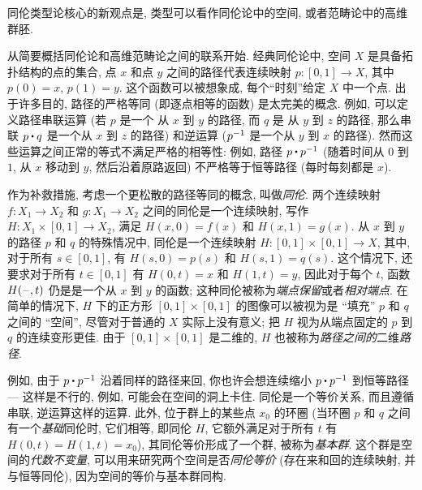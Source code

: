 同伦类型论核心的新观点是, 类型可以看作同伦论中的空间, 或者范畴论中的高维群胚.

从简要概括同伦论和高维范畴论之间的联系开始.
经典同伦论中, 空间 $X$ 是具备拓扑结构的点的集合,
%
%
点 $x$ 和点 $y$ 之间的路径代表连续映射 $p : [0,1] \to X$, 其中 $p(0) = x$, $p(1) = y$.
%
%
这个函数可以被想象成, 每个``时刻''给定 $X$ 中一个点.
出于许多目的, 路径的严格等同 (即逐点相等的函数) 是太完美的概念.
例如, 可以定义路径串联运算 (若 $p$ 是一个 从 $x$ 到 $y$ 的路径, 而 $q$ 是 从 $y$ 到 $z$ 的路径, 那么串联 $p \ct q$ 是一个从 $x$ 到 $z$ 的路径) 和逆运算 ($\mathord{{p}^{-1}}$ 是一个从 $y$ 到 $x$ 的路径).
然而这些运算之间正常的等式不满足严格的相等性: 例如, 路径 $p \ct \opp p$ (随着时间从 $0$ 到 $1$, 从 $x$ 移动到 $y$, 然后沿着原路返回) 不严格等于恒等路径 (每时每刻都是 $x$).

作为补救措施, 考虑一个更松散的路径等同的概念, 叫做\emph{同伦}.
两个连续映射 $f : X_1 \to X_2$ 和 $g : X_1\to X_2$ 之间的同伦是一个连续映射, 写作 $H : X_1 \times [0, 1] \to X_2$, 满足 $H(x, 0) = f (x)$ 和 $H(x, 1) = g(x)$.
从 $x$ 到 $y$ 的路径 $p$ 和 $q$ 的特殊情况中, 同伦是一个连续映射 $H : [0,1] \times [0,1] \rightarrow X$, 其中, 对于所有 $s\in [0,1]$, 有 $H(s,0) = p(s)$ 和 $H(s,1) = q(s)$.
这个情况下, 还要求对于所有 $t\in [0,1]$ 有 $H(0,t) = x$ 和 $H(1,t)=y$, 因此对于每个 $t$, 函数 $H(\mathord{\hspace{1pt}\text{--}\hspace{1pt}},t)$ 仍是是一个从 $x$ 到 $y$ 的函数;
这种同伦被称为\emph{端点保留}或者\emph{相对端点}.
在简单的情况下, $H$ 下的正方形 $[0,1]\times [0,1]$ 的图像可以被视为是 ``填充''  $p$ 和 $q$ 之间的 ``空间'', 尽管对于普通的 $X$ 实际上没有意义;
把 $H$ 视为从端点固定的 $p$ 到 $q$ 的连续变形更佳.
由于 $[0,1]\times [0,1]$ 是二维的, $H$ 也被称为\emph{路径之间的}二维\emph{路径}.

例如, 由于 $p \ct \opp p$ 沿着同样的路径来回, 你也许会想连续缩小 $p \ct \opp p$ 到恒等路径 --- 这样是不行的, 例如, 可能会在空间的洞上卡住.
同伦是一个等价关系, 而且遵循串联, 逆运算这样的运算.
此外, 位于群上的某些点 $x_0$ 的环圈 (当环圈 $p$ 和 $q$ 之间有一个\emph{基础}同伦时, 它们相等, 即同伦 $H$, 它额外满足对于所有 $t$ 有 $H(0,t) = H(1,t) = x_0$), 其同伦等价形成了一个群, 被称为\emph{基本群}.
%
这个群是空间的\emph{代数不变量}, 可以用来研究两个空间是否\emph{同伦等价} (存在来和回的连续映射, 并与恒等同伦), 因为空间的等价与基本群同构.

